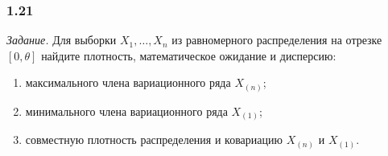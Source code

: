 \subsubsection*{1.21}

\textit{Задание.}
Для выборки $X_1, \dotsc, X_n$ из равномерного распределения на отрезке $ \left[ 0, \theta \right] $
найдите плотность, математическое ожидание и дисперсию:
\begin{enumerate}[label=\alph*)]
\item максимального члена вариационного ряда $X_{ \left( n \right) }$;
\item минимального члена вариационного ряда $X_{ \left( 1 \right) }$;
\item совместную плотность распределения и ковариацию $X_{ \left( n \right) }$ и
$X_{ \left( 1 \right) }$.
\end{enumerate}

